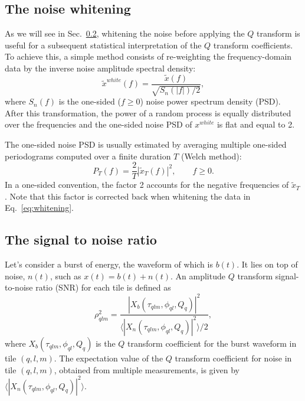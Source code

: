 \subsection{The noise whitening} \label{sec:method:whitening}

As we will see in Sec.~\ref{sec:method:snr}, whitening the noise before applying the $Q$ transform is useful for a subsequent statistical interpretation of the $Q$ transform coefficients. To achieve this, a simple method consists of re-weighting the frequency-domain data by the inverse noise amplitude spectral density:
\begin{equation}
  \tilde{x}^{white}(f) = \frac{\tilde{x}(f)}{\sqrt{S_n(|f|)/2}},
  \label{eq:whitening}
\end{equation}
where $S_n(f)$ is the one-sided ($f \ge 0$) noise power spectrum density (PSD). After this transformation, the power of a random process is equally distributed over the frequencies and the one-sided noise PSD of $x^{white}$ is flat and equal to 2.

The one-sided noise PSD is usually estimated by averaging multiple one-sided periodograms computed over a finite duration $T$ (Welch method):
\begin{equation}
  P_T(f) = \frac{2}{T}\left|\tilde{x}_T(f)\right|^2, \qquad f \ge 0.
  \label{eq:periodogram}
\end{equation}
In a one-sided convention, the factor 2 accounts for the negative frequencies of $\tilde{x}_T$. Note that this factor is corrected back when whitening the data in Eq.~\ref{eq:whitening}.


\subsection{The signal to noise ratio} \label{sec:method:snr}

Let's consider a burst of energy, the waveform of which is $b(t)$. It lies on top of noise, $n(t)$, such as $x(t) = b(t) + n(t)$. An amplitude $Q$ transform signal-to-noise ratio (SNR) for each tile is defined as
\begin{equation}
  \rho_{qlm}^2 =  \frac{|X_b(\tau_{qlm}, \phi_{ql}, Q_q)|^2}{\langle |X_n(\tau_{qlm}, \phi_{ql}, Q_q)|^2 \rangle/2}, \label{eq:snrdef}
\end{equation}
where $X_b(\tau_{qlm}, \phi_{ql}, Q_q)$ is the $Q$ transform coefficient for the burst waveform in tile $(q,l,m)$. The expectation value of the $Q$ transform coefficient for noise in tile $(q,l,m)$, obtained from multiple measurements, is given by $\langle |X_n(\tau_{qlm}, \phi_{ql}, Q_q)|^2\rangle$.

